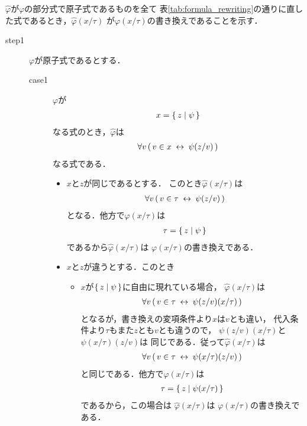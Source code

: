 	\begin{metaprf}[第一] $\widehat{\varphi}$が$\varphi$の部分式で原子式であるものを全て
		表\ref{tab:formula_rewriting}の通りに直した式であるとき，$\widehat{\varphi}(x/\tau)$
		が$\varphi(x/\tau)$の書き換えであることを示す．
		\begin{description}
			\item[step1] $\varphi$が原子式であるとする．
				\begin{description}
					\item[case1] $\varphi$が
						\begin{align}
							x = \{\, z \mid \psi\, \}
						\end{align}
						なる式のとき，$\widehat{\varphi}$は
						\begin{align}
							\forall v\, (\, v \in x \hspace{0.25em}\leftrightarrow\hspace{0.25em} \psi(z/v)\, )
						\end{align}
						なる式である．
						\begin{itemize}
							\item $x$と$z$が同じであるとする．
								このとき$\widehat{\varphi}(x/\tau)$は
								\begin{align}
									\forall v\, (\, v \in \tau \hspace{0.25em}\leftrightarrow\hspace{0.25em} \psi(z/v)\, )
								\end{align}
								となる．他方で$\varphi(x/\tau)$は
								\begin{align}
									\tau = \{\, z \mid \psi\, \}
								\end{align}
								であるから$\widehat{\varphi}(x/\tau)$は
								$\varphi(x/\tau)$の書き換えである．
								
							\item $x$と$z$が違うとする．このとき
								\begin{itemize}
									\item $x$が$\{\, z \mid \psi\, \}$に自由に現れている場合，
										$\widehat{\varphi}(x/\tau)$は
										\begin{align}
											\forall v\, (\, v \in \tau \hspace{0.25em}\leftrightarrow\hspace{0.25em} \psi(z/v)(x/\tau)\, )
										\end{align}
										となるが，書き換えの変項条件より$x$は$v$とも違い，
										代入条件より$\tau$もまた$z$とも$v$とも違うので，
										$\psi(z/v)(x/\tau)$と$\psi(x/\tau)(z/v)$は
										同じである．従って$\widehat{\varphi}(x/\tau)$は
										\begin{align}
											\forall v\, (\, v \in \tau \hspace{0.25em}\leftrightarrow\hspace{0.25em} \psi(x/\tau)(z/v)\, )
										\end{align}
										と同じである．他方で$\varphi(x/\tau)$は
										\begin{align}
											\tau = \{\, z \mid \psi(x/\tau)\, \}
										\end{align}
										であるから，この場合は
										$\widehat{\varphi}(x/\tau)$は
										$\varphi(x/\tau)$の書き換えである．
										

\end{itemize}
\end{itemize}
\end{description}
\end{description}
\end{metaprf}
